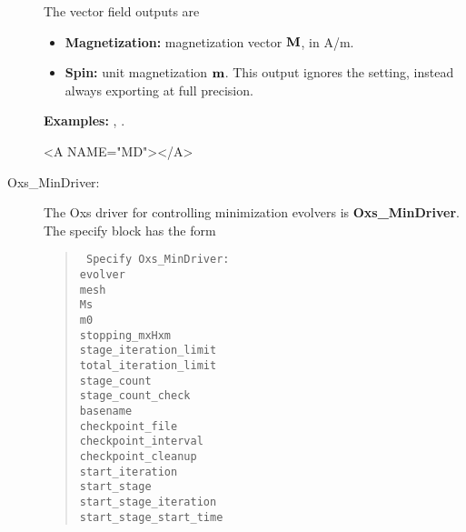\begin{description}
The vector field outputs are
\begin{itemize}
\item \textbf{Magnetization:} magnetization vector $\textbf{M}$, in A/m.
\item \textbf{Spin:} unit magnetization $\textbf{m}$.  This output ignores the
  setting, instead
always exporting at full precision.
\end{itemize}

\textbf{Examples:} , .

\begin{rawhtml}<A NAME="MD"></A>\end{rawhtml}%
%
\item[Oxs\_MinDriver:\label{html:MinDriver}]
The Oxs driver for controlling minimization evolvers is
\textbf{Oxs\_MinDriver}.  The specify block has the form
\begin{latexonly}
\begin{quote}\tt
Specify Oxs\_MinDriver: \ocb\\
 \bi evolver \\
 \bi mesh \\
 \bi Ms \\
 \bi m0 \\
 \bi stopping\_mxHxm \\
 \bi stage\_iteration\_limit \\
 \bi total\_iteration\_limit \\
 \bi stage\_count \\
 \bi stage\_count\_check \\
 \bi basename \\
 \bi checkpoint\_file \\
 \bi checkpoint\_interval \\
 \bi checkpoint\_cleanup \\
 \bi start\_iteration \\
 \bi start\_stage \\
 \bi start\_stage\_iteration \\
 \bi start\_stage\_start\_time \\

\end{quote}
\end{latexonly}
\end{description}
